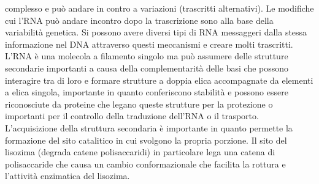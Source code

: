 complesso e pu\`o andare in contro a variazioni (trascritti alternativi). Le modifiche cui l'RNA pu\`o andare incontro dopo la trascrizione sono alla base della variabilit\`a genetica. 
Si possono avere diversi tipi di RNA messaggeri dalla stessa informazione nel DNA attraverso questi meccanismi e creare molti trascritti. L'RNA \`e una molecola a filamento singolo ma 
pu\`o assumere delle strutture secondarie importanti a causa della complementarit\`a delle basi che possono interagire tra di loro e formare strutture a doppia elica accompagnate da 
elementi a elica singola, importante in quanto conferiscono stabilit\`a e possono essere riconosciute da proteine che legano queste strutture per la protezione o importanti per il 
controllo della traduzione dell'RNA o il trasporto. L'acquisizione della struttura secondaria \`e importante in quanto permette la formazione del sito catalitico in cui svolgono la 
propria porzione. Il sito del lisozima (degrada catene polisaccaridi) in particolare lega una catena di polisaccaride che causa un cambio conformazionale che facilita la rottura e 
l'attivit\`a enzimatica del lisozima. 
